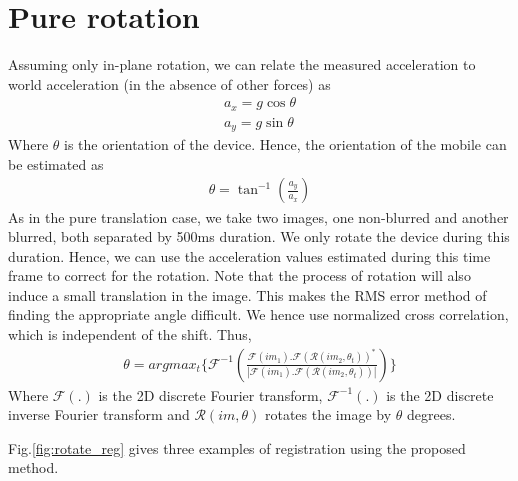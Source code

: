 \documentclass[BTech]{iitmdiss}
\begin{document}
\section{Pure rotation}
\label{image_registration:pure_rotation}
Assuming only in-plane rotation, we can relate the measured acceleration
to world acceleration (in the absence of other forces) as
\begin{align}
a_x=g\cos\theta\\
a_y=g\sin\theta
\end{align}
Where $\theta$ is the orientation of the device. Hence, the orientation
of the mobile can be estimated as
\begin{align}
\theta=\tan^{-1}(\frac{a_y}{a_x})
\end{align}
As in the pure translation case, we take two images, one non-blurred and
another blurred, both separated by 500ms duration. We only rotate the 
device during this duration. Hence, we can use the acceleration values
estimated during this time frame to correct for the rotation. Note that
the process of rotation will also induce a small translation in the 
image. This makes the RMS error method of finding the appropriate
angle difficult. We hence use normalized cross correlation, which is 
independent of the shift. Thus,
\begin{align}
\theta=argmax_t\big\{\mathcal{F}^{-1}\left(\frac{\mathcal{F}(im_1).\mathcal{F}(\mathcal{R}(im_2,\theta_t))^*}
{|\mathcal{F}(im_1).\mathcal{F}(\mathcal{R}(im_2,\theta_t))|}\right)\}
\end{align}
Where $\mathcal{F}(.)$ is the 2D discrete Fourier transform,
$\mathcal{F}^{-1}(.)$ is the 2D 
discrete inverse Fourier transform and $\mathcal{R}(im, \theta)$ rotates the
image by $\theta$ degrees.

Fig.\ref{fig:rotate_reg} gives three examples of registration using the
proposed method. 
\end{document}
